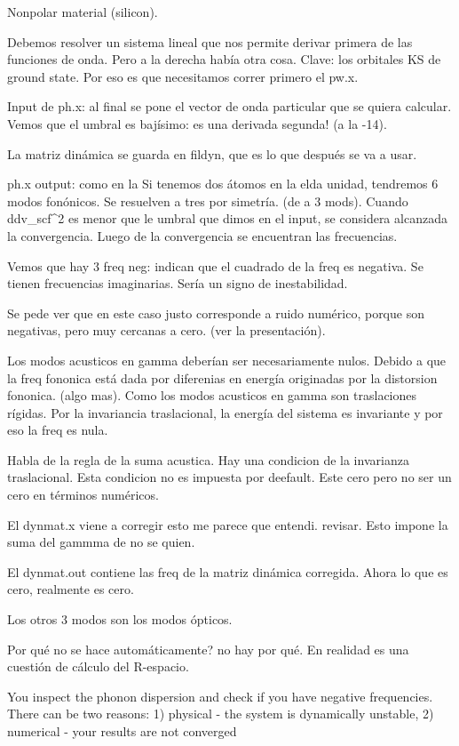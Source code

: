   Nonpolar material (silicon).

  Debemos resolver un sistema lineal que nos permite derivar primera de las funciones de onda. Pero a la derecha había otra cosa. Clave: los orbitales KS de ground state. Por eso es que necesitamos correr primero el pw.x.

  Input de ph.x: al final se pone el vector de onda particular que se quiera calcular. Vemos que el umbral es bajísimo: es una derivada segunda! (a la -14).

  La matriz dinámica se guarda en fildyn, que es lo que después se va a usar.

  ph.x output: como en la Si tenemos dos átomos en la elda unidad, tendremos 6 modos fonónicos. Se resuelven a tres por simetría. (de a 3 mods). Cuando ddv_scf^2 es menor que le umbral que dimos en el input, se considera alcanzada la convergencia. Luego de la convergencia se encuentran las frecuencias.

  Vemos que hay 3 freq neg: indican que el cuadrado de la freq es negativa. Se tienen frecuencias imaginarias. Sería un signo de inestabilidad.

  Se pede ver que en este caso justo corresponde a ruido numérico, porque son negativas, pero muy cercanas a cero. (ver la presentación).

  Los modos acusticos en gamma deberían ser necesariamente nulos. Debido a que la freq fononica está dada por diferenias en energía originadas por la distorsion fononica. (algo mas). Como los modos acusticos en gamma son traslaciones rígidas. Por la invariancia traslacional, la energía del sistema es invariante y por eso la freq es nula.

  Habla de la regla de la suma acustica. Hay una condicion de la invarianza traslacional. Esta condicion no es impuesta por deefault. Este cero  pero no ser un cero en términos numéricos.

  El dynmat.x viene a corregir esto me parece que entendi. revisar. Esto impone la suma del gammma de no se quien.

  El dynmat.out contiene las freq de la matriz dinámica corregida. Ahora lo que es cero, realmente es cero.

  Los otros 3 modos son los modos ópticos.

  Por qué no se hace automáticamente? no hay por qué. En realidad es una cuestión de cálculo del R-espacio.


  You inspect the phonon dispersion and check if you have negative frequencies. There can be two reasons: 1) physical - the system is dynamically unstable, 2) numerical - your results are not converged


